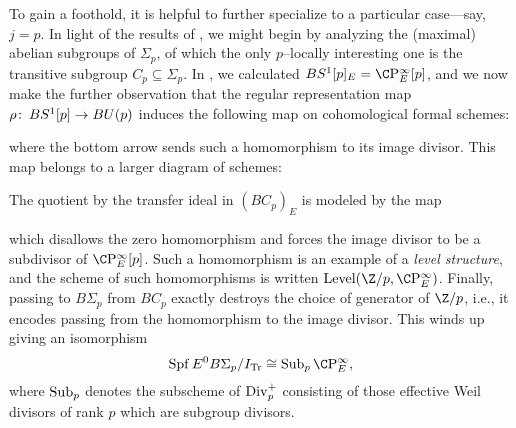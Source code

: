 \begin{example}
To gain a foothold, it is helpful to further specialize to a particular case---say, \(j = p\).  In light of the results of , we might begin by analyzing the (maximal) abelian subgroups of \(\Sigma_p\), of which the only \(p\)--locally interesting one is the transitive subgroup \(C_p \subseteq \Sigma_p\).  In , we calculated \(BS^1[p]_E = \CP^\infty_E[p]\), and we now make the further observation that the regular representation map \(\rho\colon\thinspace BS^1[p] \to BU(p)\) induces the following map on cohomological formal schemes:
\begin{center}
\end{center}
where the bottom arrow sends such a homomorphism to its image divisor.  This map belongs to a larger diagram of schemes:
\begin{center}
\end{center}
The quotient by the transfer ideal in \((BC_p)_E\) is modeled by the map
\begin{center}
\end{center}
which disallows the zero homomorphism and forces the image divisor to be a subdivisor of \(\CP^\infty_E[p]\).  Such a homomorphism is an example of a \textit{level structure}, and the scheme of such homomorphisms is written \(\Level(\Z/p, \CP^\infty_E)\).  Finally, passing to \(B\Sigma_p\) from \(BC_p\) exactly destroys the choice of generator of \(\Z/p\), i.e., it encodes passing from the homomorphism to the image divisor.  This winds up giving an isomorphism \[\Spf E^0 B\Sigma_p / I_{\Tr} \cong \Sub_p \CP^\infty_E,\] where \(\operatorname{Sub}_p\) denotes the subscheme of \(\operatorname{Div}_p^+\) consisting of those effective Weil divisors of rank \(p\) which are subgroup divisors.
\end{example}

